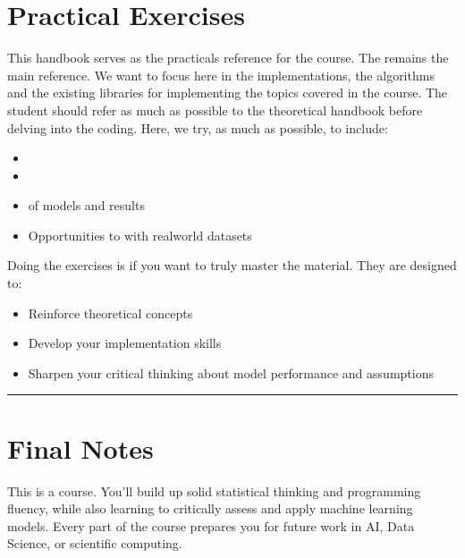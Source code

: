 \documentclass[letterpaper,10pt,english]{jupyterBook}
\begin{document}
\section{Practical Exercises}
\label{\detokenize{introduction:practical-exercises}}
\sphinxAtStartPar
This handbook serves as the practicals reference for the course. The  remains the main reference. We want to focus here in the implementations, the algorithms and the existing libraries for implementing the topics covered in the course. The student should refer as much as possible to the theoretical handbook before delving into the coding. Here, we try, as much as possible, to include:
\begin{itemize}
\item {} 
\sphinxAtStartPar
{}

\item {} 
\sphinxAtStartPar
{}

\item {} 
\sphinxAtStartPar
{} of models and results

\item {} 
\sphinxAtStartPar
Opportunities to  with real\sphinxhyphen{}world datasets

\end{itemize}

\sphinxAtStartPar
Doing the exercises is  if you want to truly master the material. They are designed to:
\begin{itemize}
\item {} 
\sphinxAtStartPar
Reinforce theoretical concepts

\item {} 
\sphinxAtStartPar
Develop your implementation skills

\item {} 
\sphinxAtStartPar
Sharpen your critical thinking about model performance and assumptions

\end{itemize}


\bigskip\hrule\bigskip



\section{Final Notes}
\label{\detokenize{introduction:final-notes}}
\sphinxAtStartPar
This is a  course. You’ll build up solid statistical thinking and programming fluency, while also learning to critically assess and apply machine learning models. Every part of the course prepares you for future work in AI, Data Science, or scientific computing.
\end{document}
